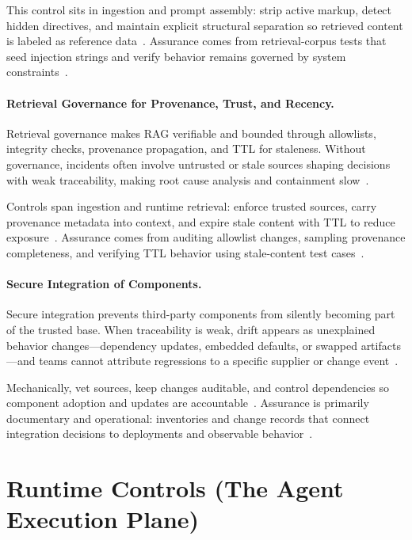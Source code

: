 \begin{TNtwocol}
  This control sits in ingestion and prompt assembly: strip active markup, detect hidden directives, and maintain explicit structural separation so retrieved content is labeled as reference data~\cite{owasp-prompt-injection-cheatsheet,owasp-top10-llm-2025}. Assurance comes from retrieval-corpus tests that seed injection strings and verify behavior remains governed by system constraints~\cite{owasp-prompt-injection-cheatsheet,owasp-top10-llm-2025}.

  \paragraph{Retrieval Governance for Provenance, Trust, and Recency.}
  Retrieval governance makes RAG verifiable and bounded through allowlists, integrity checks, provenance propagation, and TTL for staleness. Without governance, incidents often involve untrusted or stale sources shaping decisions with weak traceability, making root cause analysis and containment slow~\cite{owasp-top10-llm-2025,nist-genai-600-1}.

  Controls span ingestion and runtime retrieval: enforce trusted sources, carry provenance metadata into context, and expire stale content with TTL to reduce exposure~\cite{owasp-top10-llm-2025,nist-genai-600-1}. Assurance comes from auditing allowlist changes, sampling provenance completeness, and verifying TTL behavior using stale-content test cases~\cite{owasp-top10-llm-2025,nist-genai-600-1}.

  \paragraph{Secure Integration of Components.}
  Secure integration prevents third-party components from silently becoming part of the trusted base. When traceability is weak, drift appears as unexplained behavior changes—dependency updates, embedded defaults, or swapped artifacts—and teams cannot attribute regressions to a specific supplier or change event~\cite{nist-genai-600-1,nist-sp800-218}.

  Mechanically, vet sources, keep changes auditable, and control dependencies so component adoption and updates are accountable~\cite{nist-genai-600-1,nist-sp800-218}. Assurance is primarily documentary and operational: inventories and change records that connect integration decisions to deployments and observable behavior~\cite{nist-genai-600-1,nist-sp800-218}.

  \section{Runtime Controls (The Agent Execution Plane)}


\end{TNtwocol}
